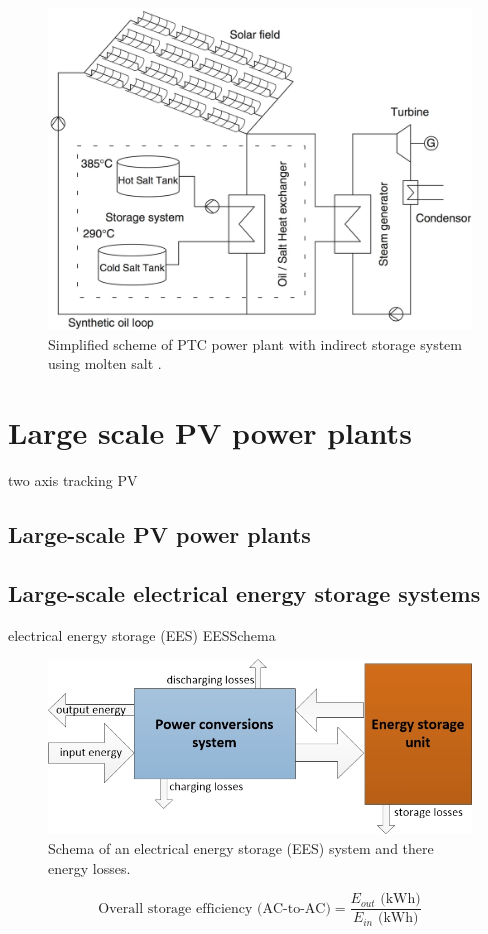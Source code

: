 \begin{figure}[htbp]  
\centering
\includegraphics[width=0.45\linewidth]{FIG/troughtindirecttwotank}
\caption[Simplified scheme of PTC power plant with indirect storage system using molten salt.]{Simplified scheme of PTC power plant with indirect storage system using molten salt \cite{Steinmann2012}.}\label{troughtindirecttwotank}
\end{figure}

\pagebreak
\section{Large scale PV power plants}\label{Large scale photo voltaic (PV) power plants}
two axis tracking PV
\subsection{Large-scale PV power plants}

\subsection{Large-scale electrical energy storage systems}
electrical energy storage (EES)
EESSchema
\begin{figure}[htbp]  
\centering
\includegraphics[width=0.65\linewidth]{FIG/EESSchema}
\caption[Schema of an electrical energy storage (EES) system and there energy losses.]{Schema of an electrical energy storage (EES) system and there energy losses.}\label{TCC_EES}
\end{figure}

\begin{equation}
\textrm{Overall storage efficiency (AC-to-AC)} =\frac{E_{out} \textrm{ (kWh)} }{E_{in} \textrm{ (kWh)}}
\end{equation}

